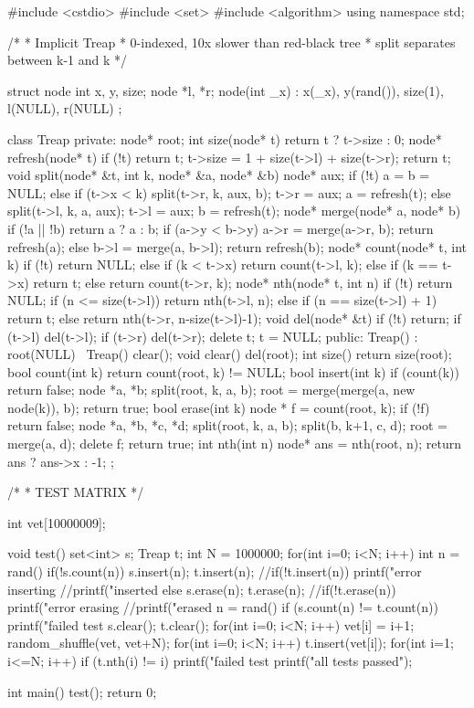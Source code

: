 \documentclass[11pt]{article}
\begin{document}
\begingroup\scriptsize
\begin{vncode}
#include <cstdio>
#include <set>
#include <algorithm>
using namespace std;

/*
 * Implicit Treap
 * 0-indexed, 10x slower than red-black tree
 * split separates between k-1 and k
 */

struct node {
	int x, y, size;
	node *l, *r;
	node(int _x) : x(_x), y(rand()), size(1), l(NULL), r(NULL) {}	
};

class Treap {
private:
	node* root;
	int size(node* t) { return t ? t->size : 0; }
	node* refresh(node* t) {
		if (!t) return t;
		t->size = 1 + size(t->l) + size(t->r);
		return t;
	}
	void split(node* &t, int k, node* &a, node* &b) {
		node* aux;
		if (!t) a = b = NULL;
		else if (t->x < k) {
			split(t->r, k, aux, b);
			t->r = aux;
			a = refresh(t);
		}
		else {
			split(t->l, k, a, aux);
			t->l = aux;
			b = refresh(t);
		}
	}
	node* merge(node* a, node* b) {
		if (!a || !b) return a ? a : b;
		if (a->y < b->y) {
			a->r = merge(a->r, b);
			return refresh(a);
		}
		else {
			b->l = merge(a, b->l);
			return refresh(b);
		}
	}
	node* count(node* t, int k) {
		if (!t) return NULL;
		else if (k < t->x) return count(t->l, k);
		else if (k == t->x) return t;
		else return count(t->r, k);
	}
	node* nth(node* t, int n) {
		if (!t) return NULL;
		if (n <= size(t->l)) return nth(t->l, n);
		else if (n == size(t->l) + 1) return t;
		else return nth(t->r, n-size(t->l)-1);
	}
	void del(node* &t) {
		if (!t) return;
		if (t->l) del(t->l);
		if (t->r) del(t->r);
		delete t;
		t = NULL;
	}
public:
	Treap() : root(NULL) { }
	~Treap() { clear(); }
	void clear() { del(root); }
	int size() { return size(root); }
	bool count(int k) { return count(root, k) != NULL; }
	bool insert(int k) {
		if (count(k)) return false;
		node *a, *b;
		split(root, k, a, b);
		root = merge(merge(a, new node(k)), b);
		return true;
	}
	bool erase(int k) {
		node * f = count(root, k);
		if (!f) return false;
		node *a, *b, *c, *d;
		split(root, k, a, b);
		split(b, k+1, c, d);
		root = merge(a, d);
		delete f;
		return true;
	}
	int nth(int n) {
		node* ans = nth(root, n);
		return ans ? ans->x : -1;
	}
};

/*
 * TEST MATRIX
 */

int vet[10000009];

void test() {
	set<int> s;
	Treap t;
	int N = 1000000;
	for(int i=0; i<N; i++) {
		int n = rand()%
		if(!s.count(n)) {
			s.insert(n);
			t.insert(n);
			//if(!t.insert(n)) printf("error inserting %
			//printf("inserted %
		}
		else{
			s.erase(n);
			t.erase(n);
			//if(!t.erase(n)) printf("error erasing %
			//printf("erased %
		}
		n = rand()%
		if (s.count(n) != t.count(n)) {
			printf("failed test %
		}
	}
	s.clear();
	t.clear();
	for(int i=0; i<N; i++) {
		vet[i] = i+1;
	}
	random_shuffle(vet, vet+N);
	for(int i=0; i<N; i++) {
		t.insert(vet[i]);
	}
	for(int i=1; i<=N; i++) {
		if (t.nth(i) != i) {
			printf("failed test %
		}
	}
	printf("all tests passed\n");
}

int main() {
	test();
	return 0;
}
\end{vncode}
\endgroup
\end{document}
